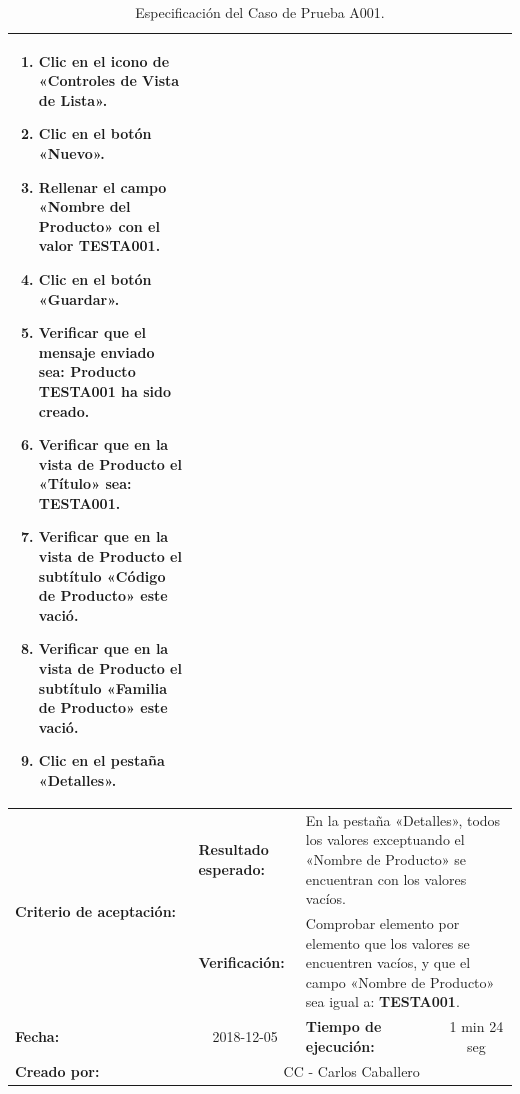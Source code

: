 \begin{table}
\begin{tabular}{|p{2.5cm}|p{2.8cm}|p{2.2cm}|p{2.8cm}|p{2.2cm}|}
{{\vspace{-3mm}
\begin{enumerate}
\item Clic en el icono de «Controles de Vista de Lista».
\item Clic en el botón «Nuevo».
\item Rellenar el campo «Nombre del Producto» con el valor \textbf{TESTA001}.
\item Clic en el botón «Guardar».
\item Verificar que el mensaje enviado sea: \textbf{Producto TESTA001 ha sido creado}.
\item Verificar que en la vista de Producto el «Título» sea: \textbf{TESTA001}.
\item Verificar que en la vista de Producto el subtítulo «Código de Producto» este vació.
\item Verificar que en la vista de Producto el subtítulo «Familia de Producto» este vació.
\item Clic en el pestaña «Detalles».
\end{enumerate}
\vspace{-5mm}
}} \\
\hline
\multirow{2}{2.8cm}{\footnotesize{\textbf{Criterio de aceptación:}}} &
\footnotesize{\textbf{Resultado esperado:}} &
\multicolumn{3}{p{9.1cm}|}{\footnotesize{En la pestaña «Detalles», todos los
valores exceptuando el «Nombre de Producto» se encuentran con los valores
vacíos.}} \\
\cline{2-5}
& \footnotesize{\textbf{Verificación:}} &
\multicolumn{3}{p{9.1cm}|}{\footnotesize{Comprobar elemento por elemento que los
valores se encuentren vacíos, y que el campo «Nombre de Producto» sea igual a:
\textbf{TESTA001}.}} \\
\hline
\footnotesize{\textbf{Fecha:}} &
\multicolumn{1}{c|}{\footnotesize{2018-12-05}} &
\multicolumn{2}{l|}{\footnotesize{\textbf{Tiempo de ejecución:}}} &
\multicolumn{1}{c|}{\footnotesize{1 min 24 seg}} \\
\hline
\footnotesize{\textbf{Creado por:}} &
\multicolumn{4}{c|}{\footnotesize{CC - Carlos Caballero}} \\
\hline
\end{tabular}
\caption{Especificación del Caso de Prueba A001.}
\label{lltc}
\end{table}


